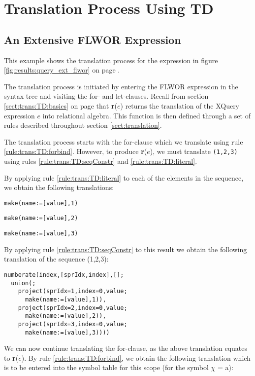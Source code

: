 \chapter{Translation Process Using TD}
\label{appendix:transl}
\section{An Extensive FLWOR Expression}
\label{appendix:transl:ext_flwor}
This example shows the translation process for the expression in figure
\ref{fig:results:query_ext_flwor} on page \pageref{fig:results:query_ext_flwor}.

The translation process is initiated by entering the FLWOR expression in the
syntax tree and visiting the for- and let-clauses. Recall from section
\ref{sect:trans:TD:basics} on page \pageref{sect:trans:TD:basics} that
\textbf{r}($e$) returns the translation of the XQuery expression $e$ into
relational algebra. This function is then defined through a set of rules
described throughout section \ref{sect:translation}.

The translation process starts with the for-clause which we translate using
rule \ref{rule:trans:TD:forbind}. However, to produce \textbf{r}($e$), we must
translate \texttt{(1,2,3)} using rules \ref{rule:trans:TD:seqConstr} and
\ref{rule:trans:TD:literal}. 

By applying rule \ref{rule:trans:TD:literal} to each of the elements in the
sequence, we obtain the following translations:
\begin{Verbatim}
make(name:=[value],1)
\end{Verbatim}
\begin{Verbatim}
make(name:=[value],2)
\end{Verbatim}
\begin{Verbatim}
make(name:=[value],3)
\end{Verbatim}

By applying rule \ref{rule:trans:TD:seqConstr} to this result we obtain the
following translation of the sequence (1,2,3):

\begin{Verbatim}
numberate(index,[sprIdx,index],[];
  union(;
    project(sprIdx=1,index=0,value;
      make(name:=[value],1)),
    project(sprIdx=2,index=0,value;
      make(name:=[value],2)),
    project(sprIdx=3,index=0,value;
      make(name:=[value],3))))
\end{Verbatim}

We can now continue translating the for-clause, as the above translation
equates to \textbf{r}($e$). By rule \ref{rule:trans:TD:forbind}, we obtain the
following translation which is to be entered into the symbol table for this
scope (for the symbol $\chi$ = a):

